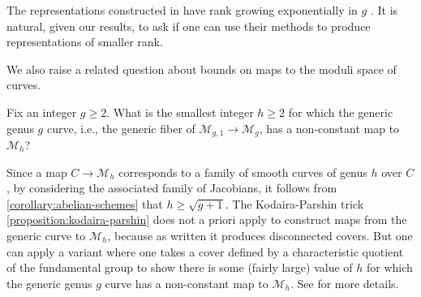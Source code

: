 The representations constructed in \cite{koberda2016quotients} have rank
growing exponentially in $g$ \cite[Corollary 4.5]{koberda2016quotients}.
It is natural, given our results, to ask if one can use their methods to produce representations of smaller rank.

We also raise a related question about bounds on maps to the moduli space of
curves.
\begin{question}
\notready
	\label{question:}
	Fix an integer $g\geq 2$.
	What is the smallest integer $h \geq 2$ for which the generic genus $g$ curve,
	i.e., the generic fiber of
	$\mathscr M_{g,1} \to \mathscr M_g$,
	has a
	non-constant map to
	$\mathscr M_h$?
\end{question}
\begin{remark}
\notready
	\label{remark:}
	Since a map $C \to \mathscr{M}_h$ corresponds to a family of
smooth curves of genus $h$ over $C$, by considering the associated family of
Jacobians, it follows from \autoref{corollary:abelian-schemes} that $h \geq
\sqrt{g+1}$.
The Kodaira-Parshin trick
\autoref{proposition:kodaira-parshin}
does not a priori apply to construct maps from the generic curve to $\mathscr{M}_h$, because as written it produces disconnected covers.
But one can apply a variant where one takes a cover defined by a characteristic quotient of the fundamental group
to show there is some (fairly large) value of $h$ for which the generic genus
$g$ curve has a non-constant map to $\mathscr M_h$.
See \cite[Theorem
1.4]{mcmullen:from-dynamics-on-surfaces-to-rational-points-on-curves} for more
details.
\end{remark}


